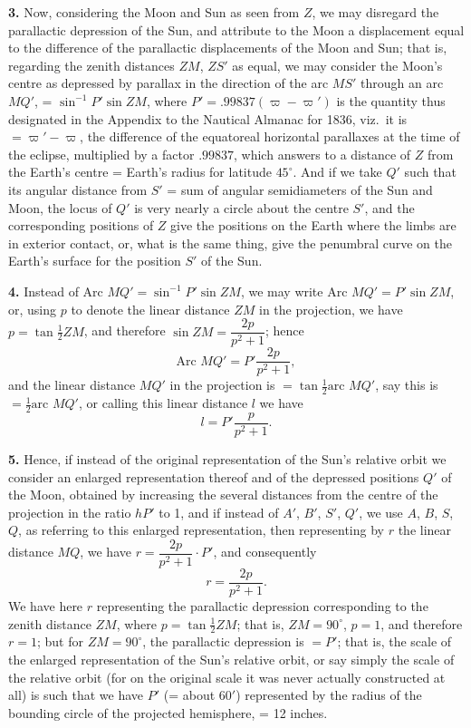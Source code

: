 \documentclass[11pt,a4paper]{article}
\begin{document}
\noindent\textbf{3.} Now, considering the Moon and Sun as seen from $Z$, we may disregard the parallactic depression of the Sun, and attribute to the Moon a displacement equal to the difference of the parallactic displacements of the Moon and Sun; that is, regarding the zenith distances $ZM$, $ZS'$ as equal, we may consider the Moon's centre as depressed by parallax in the direction of the arc $MS'$ through an arc $MQ'$, = $\sin^{-1} P' \sin ZM$, where $P' = .99837(\varpi - \varpi')$ is the quantity thus designated in the Appendix to the Nautical Almanac for 1836, viz.\ it is $= \varpi' - \varpi$, the difference of the equatoreal horizontal parallaxes at the time of the eclipse, multiplied by a factor $.99837$, which answers to a distance of $Z$ from the Earth's centre = Earth's radius for latitude $45^{\circ}$. And if we take $Q'$ such that its angular distance from $S'$ = sum of angular semidiameters of the Sun and Moon, the locus of $Q'$ is very nearly a circle about the centre $S'$, and the corresponding positions of $Z$ give the positions on the Earth where the limbs are in exterior contact, or, what is the same thing, give the penumbral curve on the Earth's surface for the position $S'$ of the Sun.

\noindent\textbf{4.} Instead of $\text{Arc } MQ' = \sin^{-1} P' \sin ZM$, we may write $\text{Arc } MQ' = P' \sin ZM$, or, using $p$ to denote the linear distance $ZM$ in the projection, we have $p = \tan \tfrac{1}{2}ZM$, and therefore $\sin ZM = \dfrac{2p}{p^{2}+1}$; hence
\[
\text{Arc } MQ' = P' \frac{2p}{p^{2}+1},
\]
and the linear distance $MQ'$ in the projection is $= \tan \tfrac{1}{2}\text{arc } MQ'$, say this is $= \tfrac{1}{2}\text{arc } MQ'$, or calling this linear distance $l$ we have
\[
l = P' \frac{p}{p^{2}+1}.
\]

\noindent\textbf{5.} Hence, if instead of the original representation of the Sun's relative orbit we consider an enlarged representation thereof and of the depressed positions $Q'$ of the Moon, obtained by increasing the several distances from the centre of the projection in the ratio $hP'$ to 1, and if instead of $A'$, $B'$, $S'$, $Q'$, we use $A$, $B$, $S$, $Q$, as referring to this enlarged representation, then representing by $r$ the linear distance $MQ$, we have $r = \dfrac{2p}{p^{2}+1} \cdot P'$, and consequently
\[
r = \frac{2p}{p^{2}+1}.
\]
We have here $r$ representing the parallactic depression corresponding to the zenith distance $ZM$, where $p = \tan \tfrac{1}{2}ZM$; that is, $ZM = 90^{\circ}$, $p = 1$, and therefore $r = 1$; but for $ZM = 90^{\circ}$, the parallactic depression is $= P'$; that is, the scale of the enlarged representation of the Sun's relative orbit, or say simply the scale of the relative orbit (for on the original scale it was never actually constructed at all) is such that we have $P'$ (= about $60'$) represented by the radius of the bounding circle of the projected hemisphere, = 12 inches.
\end{document}
